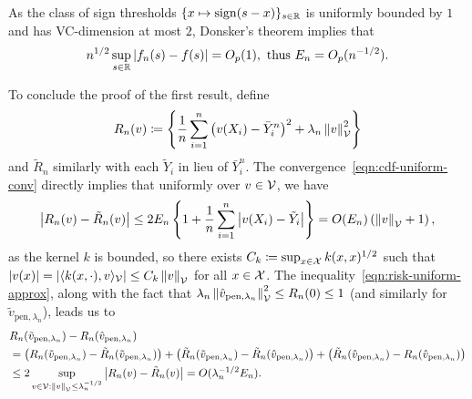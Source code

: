 As the class of sign thresholds $\{ x \mapsto \mathop{\rm sign}(s-x)\}_{s \in \mathbb{R}}$ is
uniformly bounded by $1$ and has VC-dimension at most $2$, Donsker's
theorem implies that
\begin{align}
  \label{eqn:cdf-uniform-conv}
  n^{1/2} \sup_{s \in \mathbb{R}} \left| f_n(s) - f(s) \right| =O_p(1),~ \text{thus} ~
  E_n  =O_p(n^{-1/2}).
\end{align}

To conclude the proof of the first result, define 
\begin{align*}
  R_n(v) \coloneqq
  \left\{ \frac{1}{n}\sum_{i=1}^n \left( v(X_i) - \bar{Y}_i^n \right)^2 + \lambda_n \left\|{v}\right\|_{\mathcal{V}}^2 \right\}
\end{align*}
and $\tilde{R}_n$ similarly with each $\tilde{Y}_i$ in lieu of $\bar{Y}_i^n$.
The convergence~\eqref{eqn:cdf-uniform-conv} directly implies that uniformly over $v \in \mathcal{V}$, we have
\begin{align}
\label{eqn:risk-uniform-approx}
\left| R_n(v) - \tilde{R}_n(v) \right| \le 2 E_n \left\{1+ \frac{1}{n} \sum_{i=1}^n \left| v(X_i) - \tilde{Y}_i \right| \right\} = O(E_n) \left( \left\|{v}\right\|_{\mathcal{V}} + 1 \right),
\end{align}
as the kernel $k$ is bounded, so there exists $C_k \coloneqq \sup_{x \in
  \mathcal{X}} k(x,x)^{1/2}$ such that $|v(x)| = |\langle k(x,\cdot), v
\rangle_{\mathcal{V}}| \le C_k \left\|{v}\right\|_{\mathcal{V}}$ for all $x \in \mathcal{X}$.  The
inequality~\eqref{eqn:risk-uniform-approx}, along with the fact that
$\lambda_n \left\|{\hat v_{\text{pen}, \lambda_n}}\right\|_{\mathcal{V}}^2 \le R_n(0) \le 1$
(and similarly for $\tilde{v}_{\text{pen}, \lambda_n}$), leads us to
\begin{align*}
&R_n(\tilde{v}_{\text{pen}, \lambda_n}) - R_n(\hat v_{\text{pen}, \lambda_n})\\ &= 
\left( R_n(\tilde{v}_{\text{pen}, \lambda_n}) - \tilde{R}_n(\tilde{v}_{\text{pen}, \lambda_n}) \right) +  \left( \tilde{R}_n(\tilde{v}_{\text{pen}, \lambda_n}) - \tilde{R}_n(\hat v_{\text{pen}, \lambda_n}) \right) + 
\left(\tilde{R}_n(\hat v_{\text{pen}, \lambda_n}) - R_n(\hat v_{\text{pen}, \lambda_n}) \right) \\
 &\le 2 \sup_{v \in \mathcal{V}: \left\|{v}\right\|_{\mathcal{V}} \le \lambda_n^{-1/2}} \left| R_n(v) - \tilde{R}_n(v) \right| = O(\lambda_n^{-1/2} E_n).
\end{align*}


